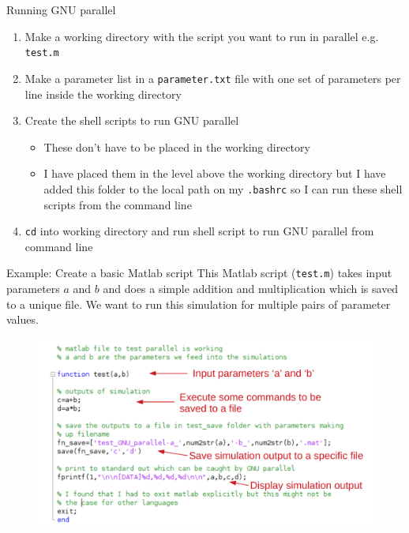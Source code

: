 \documentclass{beamer}
\begin{document}
\begin{frame}{Running GNU parallel}
\begin{enumerate}
\item Make a working directory with the script you want to run in parallel e.g. \texttt{test.m}
\item Make a parameter list in a \texttt{parameter.txt} file with one set of parameters per line inside the working directory
\item Create the shell scripts to run GNU parallel
\begin{itemize}
\item These don't have to be placed in the working directory
\item I have placed them in the level above the working directory but I have added this folder to the local path on my \texttt{.bashrc} so I can run these shell scripts from the command line
\end{itemize}
\item \texttt{cd} into working directory and run shell script to run GNU parallel from command line
\end{enumerate}
\end{frame}

\begin{frame}{Example: Create a basic Matlab script}
This Matlab script (\texttt{test.m}) takes input parameters $a$ and $b$ and does a simple addition and multiplication which is saved to a unique file. We want to run this simulation for multiple pairs of parameter values.
\begin{figure}
\includegraphics[width=.8\linewidth]{figures/matlab_code_annotated.pdf}	
\end{figure}
\end{frame}
\end{document}
